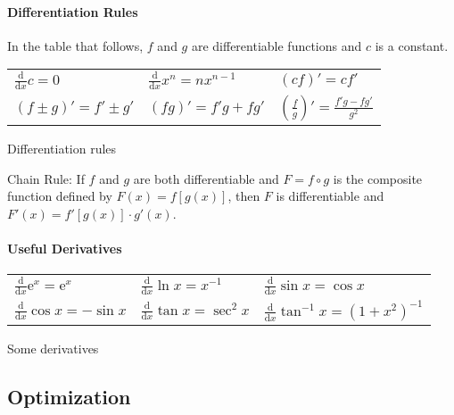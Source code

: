 \documentclass[captions=tableheading]{scrbook}
\begin{document}
\paragraph*{Differentiation Rules}
In the table that follows, $f$ and $g$ are differentiable functions and $c$ is a constant.

\begin{center}
\begin{tabular}{lll}
 $\frac{\mathrm{d}}{\mathrm{d} x}c=0$  &  $\frac{\mathrm{d}}{\mathrm{d} x}x^{n}=nx^{n-1}$  &  $(cf)'=cf'$                                        \\
 $(f\pm g)'=f'\pm g'$                  &  $(fg)'=f'g+fg'$                                  &  $\left(\frac{f}{g}\right)'=\frac{f'g-fg'}{g^{2}}$  \\
\end{tabular}
\end{center}


\caption{Differentiation rules\textbf{\label{tab:Differentiation-Rules}}}

\begin{thm}
Chain Rule: If $f$ and $g$ are both differentiable and $F=f\circ g$ is the composite function defined by $F(x)=f[g(x)]$, then $F$ is differentiable and $F'(x) = f'[ g(x) ] \cdot g'(x)$.  
\end{thm}

\paragraph*{Useful Derivatives}


\begin{center}
\begin{tabular}{lll}
 $\frac{\mathrm{d}}{\mathrm{d} x}\mathrm{e}^{x}=\mathrm{e}^{x}$  &  $\frac{\mathrm{d}}{\mathrm{d} x}\ln x=x^{-1}$      &  $\frac{\mathrm{d}}{\mathrm{d} x}\sin x=\cos x$              \\
 $\frac{\mathrm{d}}{\mathrm{d} x}\cos x=-\sin x$                 &  $\frac{\mathrm{d}}{\mathrm{d} x}\tan x=\sec^{2}x$  &  $\frac{\mathrm{d}}{\mathrm{d} x}\tan^{-1}x=(1+x^{2})^{-1}$  \\
\end{tabular}
\end{center}


\caption{Some derivatives\label{tab:Useful-Derivatives}}
\subsection{Optimization}
\label{sec-6-2-3}
\end{document}
